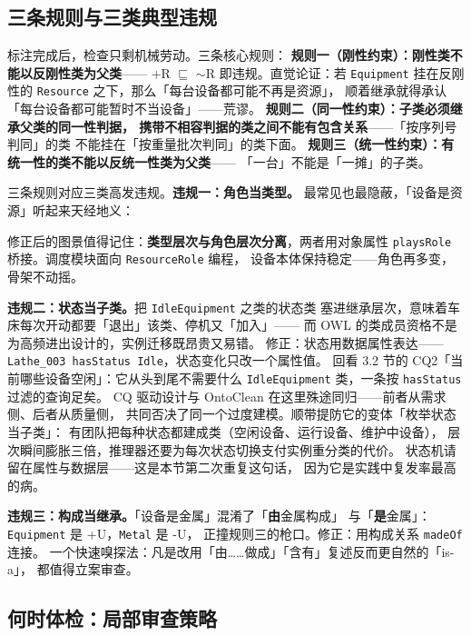 \subsection{三条规则与三类典型违规}

标注完成后，检查只剩机械劳动。三条核心规则：
\textbf{规则一（刚性约束）：刚性类不能以反刚性类为父类}——
+R \(\sqsubseteq\) \(\sim\)R 即违规。直觉论证：若 \texttt{Equipment}
挂在反刚性的 \texttt{Resource} 之下，那么「每台设备都可能不再是资源」，
顺着继承就得承认「每台设备都可能暂时不当设备」——荒谬。
\textbf{规则二（同一性约束）：子类必须继承父类的同一性判据，
携带不相容判据的类之间不能有包含关系}——「按序列号判同」的类
不能挂在「按重量批次判同」的类下面。
\textbf{规则三（统一性约束）：有统一性的类不能以反统一性类为父类}——
「一台」不能是「一摊」的子类。

三条规则对应三类高发违规。\textbf{违规一：角色当类型。}
最常见也最隐蔽，「设备是资源」听起来天经地义：



修正后的图景值得记住：\textbf{类型层次与角色层次分离}，两者用对象属性
\texttt{playsRole} 桥接。调度模块面向 \texttt{ResourceRole} 编程，
设备本体保持稳定——角色再多变，骨架不动摇。

\textbf{违规二：状态当子类。}把 \texttt{IdleEquipment} 之类的状态类
塞进继承层次，意味着车床每次开动都要「退出」该类、停机又「加入」——
而 OWL 的类成员资格不是为高频进出设计的，实例迁移既昂贵又易错。
修正：状态用数据属性表达——\texttt{Lathe\_003 hasStatus Idle}，状态变化只改一个属性值。
回看 3.2 节的 CQ2「当前哪些设备空闲」：它从头到尾不需要什么
\texttt{IdleEquipment} 类，一条按 \texttt{hasStatus} 过滤的查询足矣。
CQ 驱动设计与 OntoClean 在这里殊途同归——前者从需求侧、后者从质量侧，
共同否决了同一个过度建模。顺带提防它的变体「枚举状态当子类」：
有团队把每种状态都建成类（空闲设备、运行设备、维护中设备），
层次瞬间膨胀三倍，推理器还要为每次状态切换支付实例重分类的代价。
状态机请留在属性与数据层——这是本节第二次重复这句话，
因为它是实践中复发率最高的病。

\textbf{违规三：构成当继承。}「设备是金属」混淆了「\textbf{由}金属构成」
与「\textbf{是}金属」：\texttt{Equipment} 是 +U，\texttt{Metal} 是 -U，
正撞规则三的枪口。修正：用构成关系 \texttt{madeOf} 连接。
一个快速嗅探法：凡是改用「由……做成」「含有」复述反而更自然的「is-a」，
都值得立案审查。

\subsection{何时体检：局部审查策略}

